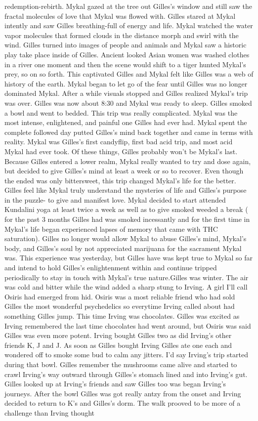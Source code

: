 \documentclass[12pt]{book}
\begin{document}
redemption-rebirth. Mykal gazed at the tree out Gilles's window and still saw the fractal molecules of love that Mykal was flowed with. Gilles stared at Mykal intently and saw Gilles breathing-full of energy and life. Mykal watched the water vapor molecules that formed clouds in the distance morph and swirl with the wind. Gilles turned into images of people and animals and Mykal saw a historic play take place inside of Gilles. Ancient looked Asian women was washed clothes in a river one moment and then the scene would shift to a tiger hunted Mykal's prey, so on so forth. This captivated Gilles and Mykal felt like Gilles was a web of history of the earth. Mykal began to let go of the fear until Gilles was no longer dominated Mykal. After a while visuals stopped and Gilles realized Mykal's trip was over. Gilles was now about 8:30 and Mykal was ready to sleep. Gilles smoked a bowl and went to bedded. This trip was really complicated. Mykal was the most intense, enlightened, and painful one Gilles had ever had. Mykal spent the complete followed day putted Gilles's mind back together and came in terms with reality. Mykal was Gilles's first candyflip, first bad acid trip, and most acid Mykal had ever took. Of these things, Gilles probably won't be Mykal's last. Because Gilles entered a lower realm, Mykal really wanted to try and dose again, but decided to give Gilles's mind at least a week or so to recover. Even though the ended was only bittersweet, this trip changed Mykal's life for the better. Gilles feel like Mykal truly understand the mysteries of life and Gilles's purpose in the puzzle- to give and manifest love. Mykal decided to start attended Kundalini yoga at least twice a week as well as to give smoked weeded a break ( for the past 3 months Gilles had was smoked incessantly and for the first time in Mykal's life began experienced lapses of memory that came with THC saturation). Gilles no longer would allow Mykal to abuse Gilles's mind, Mykal's body, and Gilles's soul by not appreciated marijuana for the sacrament Mykal was. This experience was yesterday, but Gilles have was kept true to Mykal so far and intend to hold Gilles's enlightenment within and continue tripped periodically to stay in touch with Mykal's true nature.Gilles was winter. The air was cold and bitter while the wind added a sharp stung to Irving. A girl I'll call Osiris had emerged from hid. Osiris was a most reliable friend who had sold Gilles the most wonderful psychedelics so everytime Irving called about had something Gilles jump. This time Irving was chocolates. Gilles was excited as Irving remembered the last time chocolates had went around, but Osiris was said Gilles was even more potent. Irving bought Gilles two as did Irving's other friends K, J and J. As soon as Gilles bought Irving Gilles ate one each and wondered off to smoke some bud to calm any jitters. I'd say Irving's trip started during that bowl. Gilles remember the mushrooms came alive and started to crawl Irving's way outward through Gilles's stomach lined and into Irving's gut. Gilles looked up at Irving's friends and saw Gilles too was began Irving's journeys. After the bowl Gilles was got really antzy from the onset and Irving decided to return to K's and Gilles's dorm. The walk prooved to be more of a challenge than Irving thought 
\end{document}
